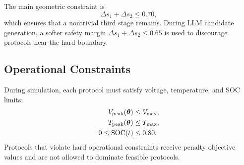 The main geometric constraint is
\begin{equation}
\Delta s_1+\Delta s_2 \leq 0.70,
\label{eq:dsoc}
\end{equation}
which ensures that a nontrivial third stage remains. During LLM candidate
generation, a softer safety margin $\Delta s_1+\Delta s_2 \leq 0.65$ is used to
discourage protocols near the hard boundary.

\subsection{Operational Constraints}

During simulation, each protocol must satisfy voltage, temperature, and SOC
limits:
\begin{align}
V_{\mathrm{peak}}(\boldsymbol{\theta}) &\leq V_{\max},\\
T_{\mathrm{peak}}(\boldsymbol{\theta}) &\leq T_{\max},\\
0 \leq \mathrm{SOC}(t) &\leq 0.80 .
\end{align}
Protocols that violate hard operational constraints receive penalty objective
values and are not allowed to dominate feasible protocols.

